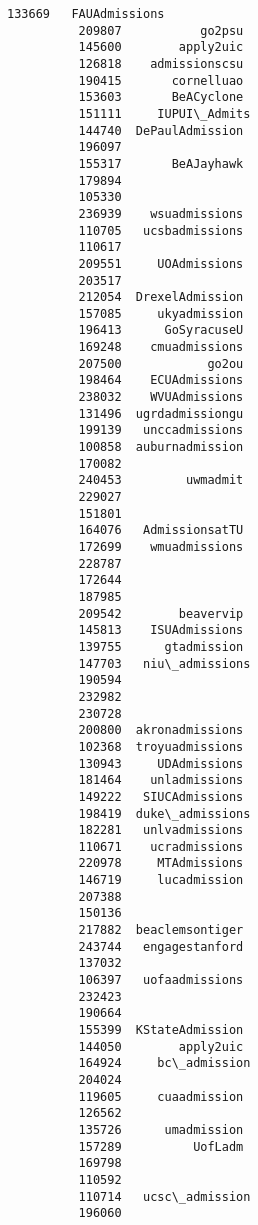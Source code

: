 \documentclass[11pt]{article}
\begin{document}
\begin{Verbatim}[commandchars=\\\{\}]
          133669   FAUAdmissions   
          209807           go2psu  
          145600        apply2uic  
          126818    admissionscsu  
          190415       cornelluao  
          153603       BeACyclone  
          151111     IUPUI\_Admits  
          144740  DePaulAdmission  
          196097                   
          155317       BeAJayhawk  
          179894                   
          105330                   
          236939    wsuadmissions  
          110705   ucsbadmissions  
          110617                   
          209551     UOAdmissions  
          203517                   
          212054  DrexelAdmission  
          157085     ukyadmission  
          196413      GoSyracuseU  
          169248    cmuadmissions  
          207500            go2ou  
          198464    ECUAdmissions  
          238032    WVUAdmissions  
          131496  ugrdadmissiongu  
          199139   unccadmissions  
          100858  auburnadmission  
          170082                   
          240453         uwmadmit  
          229027                   
          151801                   
          164076   AdmissionsatTU  
          172699    wmuadmissions  
          228787                   
          172644                   
          187985                   
          209542        beavervip  
          145813    ISUAdmissions  
          139755      gtadmission  
          147703   niu\_admissions  
          190594                   
          232982                   
          230728                   
          200800  akronadmissions  
          102368  troyuadmissions  
          130943     UDAdmissions  
          181464    unladmissions  
          149222   SIUCAdmissions  
          198419  duke\_admissions  
          182281   unlvadmissions  
          110671    ucradmissions  
          220978     MTAdmissions  
          146719     lucadmission  
          207388                   
          150136                   
          217882  beaclemsontiger  
          243744   engagestanford  
          137032                   
          106397   uofaadmissions  
          232423                   
          190664                   
          155399  KStateAdmission  
          144050        apply2uic  
          164924     bc\_admission  
          204024                   
          119605     cuaadmission  
          126562                   
          135726      umadmission  
          157289          UofLadm  
          169798                   
          110592                   
          110714   ucsc\_admission  
          196060                   

\end{Verbatim}
\end{document}
